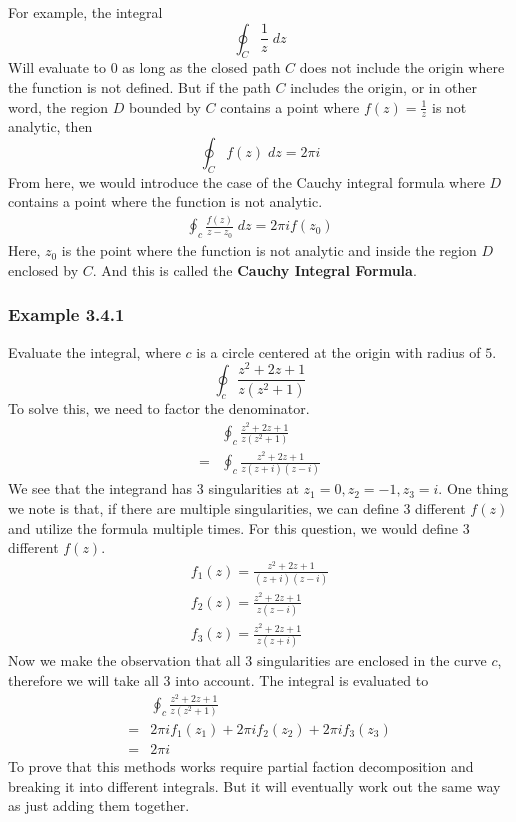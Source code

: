 \documentclass[12pt]{book}
\begin{document}
For example, the integral
\[
\oint_C \frac{1}{z}\; dz
\]
Will evaluate to $0$ as long as the closed path $C$ does not include the origin where the function is not defined. But if the path $C$ includes the origin, or in other word, the region $D$ bounded by $C$ contains a point where $f(z)= \frac{1}{z}$ is not analytic, then 
\[
\oint_C f(z) \; dz = 2 \pi i
\]
From here, we would introduce the case of the Cauchy integral formula where $D$ contains a point where the function is not analytic. 
\begin{align}
    \oint_c \frac{f(z)}{z-z_0} \; dz = 2\pi i f(z_0)
\end{align} 
Here, $z_0$ is the point where the function is not analytic and inside the region $D$ enclosed by $C$. And this is called the \textbf{Cauchy Integral Formula}.

\subsubsection{Example 3.4.1}
Evaluate the integral, where $c$ is a circle centered at the origin with radius of $5$.
\[
\oint_c \frac{z^2+2z+1}{z(z^2+1)}
\]
To solve this, we need to factor the denominator.
\begin{align*}
     &\oint_c \frac{z^2+2z+1}{z(z^2+1)}\\
    =&\oint_c \frac{z^2+2z+1}{z(z+i)(z-i)}
\end{align*}
We see that the integrand has 3 singularities at $z_1 = 0, z_2 = -1, z_3 = i$. One thing we note is that, if there are multiple singularities, we can define 3 different $f(z)$ and utilize the formula multiple times. For this question, we would define 3 different $f(z)$.
\begin{align*}
    f_1(z) = \frac{z^2+2z+1}{(z+i)(z-i)}\\
    f_2(z) = \frac{z^2+2z+1}{z(z-i)}\\
    f_3(z) = \frac{z^2+2z+1}{z(z+i)}
\end{align*}
Now we make the observation that all 3 singularities are enclosed in the curve $c$, therefore we will take all 3 into account. The integral is evaluated to
\begin{align*}
     &\oint_c \frac{z^2+2z+1}{z(z^2+1)}\\
    =&2\pi i f_1(z_1) + 2\pi i f_2(z_2) + 2\pi i f_3(z_3)\\
    =&2\pi i
\end{align*}
To prove that this methods works require partial faction decomposition and breaking it into different integrals. But it will eventually work out the same way as just adding them together.
\end{document}
